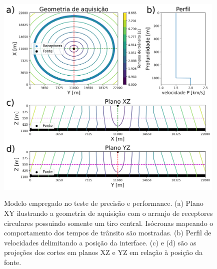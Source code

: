 
\begin{figure}[H]
	\centering
	\includegraphics[width = 11cm, height = 10.5cm]{Imgs/RevisaoBibliografica/modelGeometry.png}
	\caption{Modelo empregado no teste de precisão e performance. (a) Plano XY ilustrando a geometria de aquisição com o arranjo de receptores circulares possuindo somente um tiro central. Isócronas mapeando o comportamento dos tempos de trânsito são mostradas. (b) Perfil de velocidades delimitando a posição da interface. (c) e (d) são as projeções dos cortes em planos XZ e YZ em relação à posição da fonte.}
	\label{fig:configurationNumericalComparison}
\end{figure}

